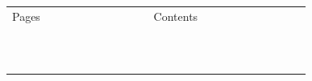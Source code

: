 \documentclass[12pt,a5paper]{book}
\begin{document}
\NoBgThispage






\begin{table}[h!]

\begin{tabular}{c ccccccccccccccccccccccc}

     Pages & \multicolumn{23}{c}{Contents}  \\
    \vspace{5pt}
    & & & & & & & & & & & & & & & & & & & & & & &  \\
     \cline{1-2} \cline{4-23} 
    \vspace{5pt}
    & & & & & & & & & & & & & & & & & & & & & & &  \\
    \cline{1-2} \cline{4-23}
    \vspace{5pt}
    & & & & & & & & & & & & & & & & & & & & & & &  \\
    \cline{1-2} \cline{4-23}
    \vspace{5pt}
    & & & & & & & & & & & & & & & & & & & & & & &  \\
    \cline{1-2} \cline{4-23}
    \vspace{5pt}
    & & & & & & & & & & & & & & & & & & & & & & &  \\
    \cline{1-2} \cline{4-23}
    \vspace{5pt}
    & & & & & & & & & & & & & & & & & & & & & & &  \\
    \cline{1-2} \cline{4-23}
    \vspace{5pt}
    & & & & & & & & & & & & & & & & & & & & & & &  \\
    \cline{1-2} \cline{4-23}
    \vspace{5pt}
    & & & & & & & & & & & & & & & & & & & & & & &  \\
    \cline{1-2} \cline{4-23}
    \vspace{5pt}
    & & & & & & & & & & & & & & & & & & & & & & &  \\
    \cline{1-2} \cline{4-23}
    \vspace{5pt}
    & & & & & & & & & & & & & & & & & & & & & & &  \\
    \cline{1-2} \cline{4-23}
    \vspace{5pt}

\end{tabular}
\end{table}
\end{document}
